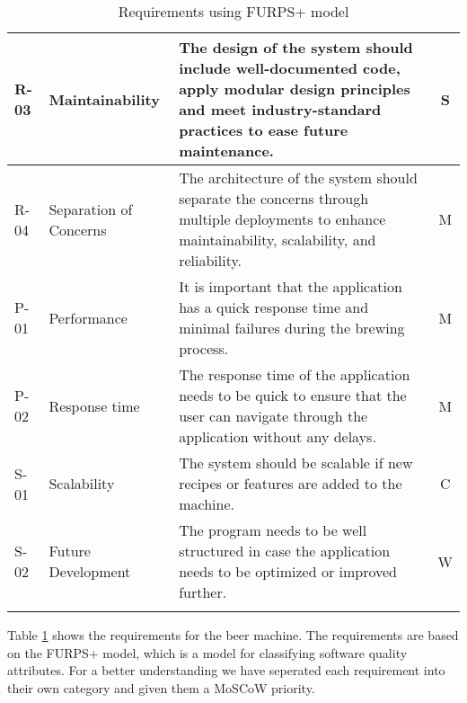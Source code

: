 \begin{center}
\begin{longtable}{|p{1cm}|p{4cm}|p{8.5cm}|c|}
        R-03   & Maintainability            & The design of the system should include well-documented code, apply modular design principles and meet industry-standard practices to ease future maintenance.& S \\ \hline 
        R-04   & Separation of Concerns     & The architecture of the system should separate the concerns through multiple deployments to enhance maintainability, scalability, and reliability.            & M \\ \hline
        P-01   & Performance                & It is important that the application has a quick response time and minimal failures during the brewing process.                                               & M \\ \hline
        P-02   & Response time              & The response time of the application needs to be quick to ensure that the user can navigate through the application without any delays.                       & M \\ \hline
        S-01   & Scalability                & The system should be scalable if new recipes or features are added to the machine.                                                                            & C \\ \hline
        S-02   & Future Development         & The program needs to be well structured in case the application needs to be optimized or improved further.                                                    & W \\ \hline

        \caption{Requirements using FURPS+ model}
        \label{tab:requirements}
    \end{longtable}
\end{center}

Table \ref{tab:requirements} shows the requirements for the beer machine. The requirements are based on the FURPS+ model, which is a model for classifying software quality attributes. For a better understanding we have seperated each requirement into their own category and given them a MoSCoW priority.







